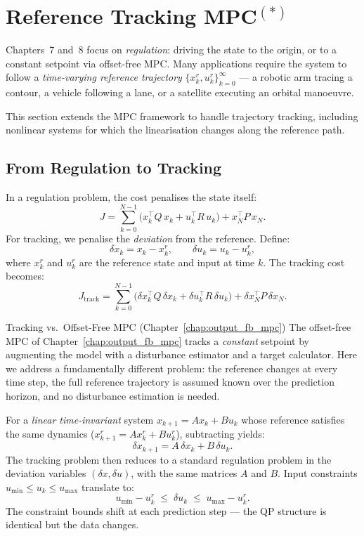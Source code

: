 \section{Reference Tracking MPC\texorpdfstring{$^{(*)}$}{(*)}}
\label{sec:tracking_mpc}

Chapters~7 and~8 focus on \emph{regulation}: driving the state to the origin, or to a constant setpoint via offset-free MPC. Many applications require the system to follow a \emph{time-varying reference trajectory} $\{x^r_k, u^r_k\}_{k=0}^{\infty}$ --- a robotic arm tracing a contour, a vehicle following a lane, or a satellite executing an orbital manoeuvre.

This section extends the MPC framework to handle trajectory tracking, including nonlinear systems for which the linearisation changes along the reference path.

\subsection{From Regulation to Tracking}

In a regulation problem, the cost penalises the state itself:
\[
J = \sum_{k=0}^{N-1} \bigl(x_k^\top Q\, x_k + u_k^\top R\, u_k\bigr) + x_N^\top P\, x_N.
\]
For tracking, we penalise the \emph{deviation} from the reference. Define:
\[
\delta x_k = x_k - x^r_k, \qquad \delta u_k = u_k - u^r_k,
\]
where $x^r_k$ and $u^r_k$ are the reference state and input at time $k$. The tracking cost becomes:
\[
J_{\text{track}} = \sum_{k=0}^{N-1} \bigl(\delta x_k^\top Q\, \delta x_k + \delta u_k^\top R\, \delta u_k\bigr) + \delta x_N^\top P\, \delta x_N.
\]

\begin{notebox}{Tracking vs.\ Offset-Free MPC (Chapter~\ref{chap:output_fb_mpc})}
	The offset-free MPC of Chapter~\ref{chap:output_fb_mpc} tracks a \emph{constant} setpoint by augmenting the model with a disturbance estimator and a target calculator. Here we address a fundamentally different problem: the reference changes at every time step, the full reference trajectory is assumed known over the prediction horizon, and no disturbance estimation is needed.
\end{notebox}

For a \emph{linear time-invariant} system $x_{k+1} = Ax_k + Bu_k$ whose reference satisfies the same dynamics ($x^r_{k+1} = Ax^r_k + Bu^r_k$), subtracting yields:
\[
\delta x_{k+1} = A\,\delta x_k + B\,\delta u_k.
\]
The tracking problem then reduces to a standard regulation problem in the deviation variables $(\delta x, \delta u)$, with the same matrices $A$ and $B$. Input constraints $u_{\min} \le u_k \le u_{\max}$ translate to:
\[
u_{\min} - u^r_k \;\le\; \delta u_k \;\le\; u_{\max} - u^r_k.
\]
The constraint bounds shift at each prediction step --- the QP structure is identical but the data changes.

